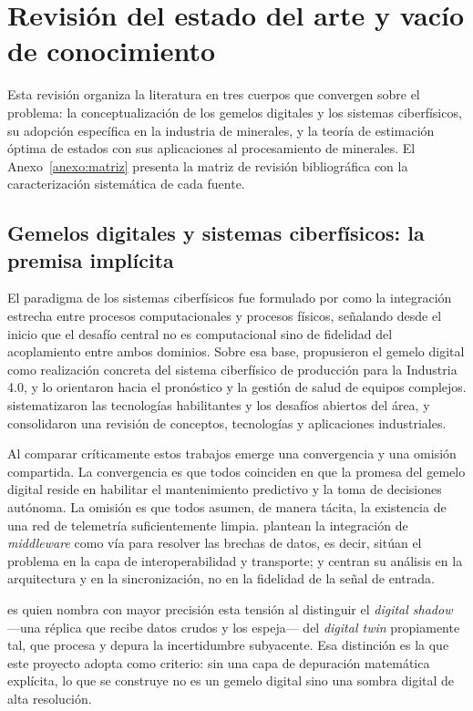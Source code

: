 \section{Revisión del estado del arte y vacío de conocimiento}
\label{sec:estado-arte}

Esta revisión organiza la literatura en tres cuerpos que convergen sobre el
problema: la conceptualización de los gemelos digitales y los sistemas
ciberfísicos, su adopción específica en la industria de minerales, y la teoría
de estimación óptima de estados con sus aplicaciones al procesamiento de
minerales. El Anexo~\ref{anexo:matriz} presenta la matriz de revisión
bibliográfica con la caracterización sistemática de cada fuente.

\subsection{Gemelos digitales y sistemas ciberfísicos: la premisa implícita}

El paradigma de los sistemas ciberfísicos fue formulado por \textcite{lee2008}
como la integración estrecha entre procesos computacionales y procesos físicos,
señalando desde el inicio que el desafío central no es computacional sino de
fidelidad del acoplamiento entre ambos dominios. Sobre esa base,
\textcite{uhlemann2017} propusieron el gemelo digital como realización concreta
del sistema ciberfísico de producción para la Industria 4.0, y
\textcite{tao2019} lo orientaron hacia el pronóstico y la gestión de salud de
equipos complejos. \textcite{fuller2020} sistematizaron las tecnologías
habilitantes y los desafíos abiertos del área, y \textcite{liu2021} consolidaron
una revisión de conceptos, tecnologías y aplicaciones industriales.

Al comparar críticamente estos trabajos emerge una convergencia y una omisión
compartida. La convergencia es que todos coinciden en que la promesa del gemelo
digital reside en habilitar el mantenimiento predictivo y la toma de decisiones
autónoma. La omisión es que todos asumen, de manera tácita, la existencia de una
red de telemetría suficientemente limpia. \textcite{uhlemann2017} plantean la
integración de \emph{middleware} como vía para resolver las brechas de datos, es
decir, sitúan el problema en la capa de interoperabilidad y transporte;
\textcite{tao2019} y \textcite{fuller2020} centran su análisis en la
arquitectura y en la sincronización, no en la fidelidad de la señal de entrada.

\textcite{sepasgozar2021} es quien nombra con mayor precisión esta tensión al
distinguir el \emph{digital shadow} —una réplica que recibe datos crudos y los
espeja— del \emph{digital twin} propiamente tal, que procesa y depura la
incertidumbre subyacente. Esa distinción es la que este proyecto adopta como
criterio: sin una capa de depuración matemática explícita, lo que se construye
no es un gemelo digital sino una sombra digital de alta resolución.

